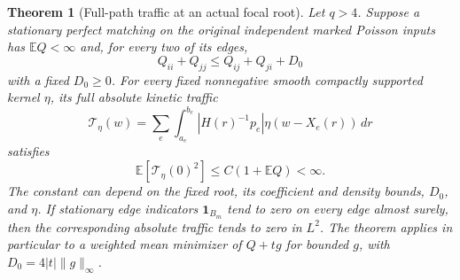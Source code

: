 \documentclass[11pt,reqno]{amsart}
\newtheorem{theorem}{Theorem}[section]
\theoremstyle{definition}
\theoremstyle{remark}
\numberwithin{equation}{section}
\newcommand{\E}{\mathbb E}
\begin{document}
\begin{theorem}[Full-path traffic at an actual focal root]
\label{thm:focal-full-path-traffic}
Let $q>4$. Suppose a stationary perfect matching on the original
independent marked Poisson inputs has $\E Q<\infty$ and, for every two
of its edges,
\[
 Q_{ii}+Q_{jj}\le Q_{ij}+Q_{ji}+D_0
\]
with a fixed $D_0\ge0$. For every fixed nonnegative smooth compactly
supported kernel $\eta$, its full absolute kinetic traffic
\[
 \mathcal T_\eta(w)=\sum_e\int_{a_e}^{b_e}
       |H(r)^{-1}p_e|\eta(w-X_e(r))\,dr
\]
satisfies
\begin{equation}\label{eq:focal-traffic-full-bound}
 \E[\mathcal T_\eta(0)^2]\le C(1+\E Q)<\infty.
\end{equation}
The constant can depend on the fixed root, its coefficient and density
bounds, $D_0$, and $\eta$. If stationary edge indicators
$\mathbf1_{B_m}$ tend to zero on every edge almost surely, then the
corresponding absolute traffic tends to zero in $L^2$. The theorem
applies in particular to a weighted mean minimizer of $Q+t g$ for
bounded $g$, with $D_0=4|t|\|g\|_\infty$.
\end{theorem}
\end{document}
